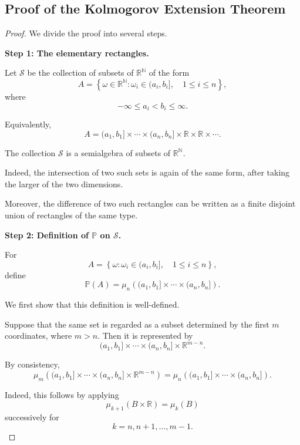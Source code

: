 
\subsection{Proof of the Kolmogorov Extension Theorem}

\begin{proof}

We divide the proof into several steps.

\medskip
\noindent
\textbf{Step 1: The elementary rectangles.}

Let $\mathcal{S}$ be the collection of subsets of
$\mathbb{R}^{\mathbb{N}}$ of the form
\[
A=
\left\{
\omega\in\mathbb{R}^{\mathbb{N}}:
\omega_i\in(a_i,b_i],
\quad
1\leq i\leq n
\right\},
\]
where
\[
-\infty\leq a_i<b_i\leq\infty.
\]

Equivalently,
\[
A=
(a_1,b_1]\times\cdots\times(a_n,b_n]
\times\mathbb{R}\times\mathbb{R}\times\cdots.
\]

The collection $\mathcal{S}$ is a semialgebra of subsets of
$\mathbb{R}^{\mathbb{N}}$.

Indeed, the intersection of two such sets is again of the same
form, after taking the larger of the two dimensions.

Moreover, the difference of two such rectangles can be written as a
finite disjoint union of rectangles of the same type.

\medskip
\noindent
\textbf{Step 2: Definition of $\mathbb{P}$ on $\mathcal{S}$.}

For
\[
A=
\left\{
\omega:
\omega_i\in(a_i,b_i],
\quad
1\leq i\leq n
\right\},
\]
define
\[
\boxed{
\mathbb{P}(A)
=
\mu_n
\left(
(a_1,b_1]\times\cdots\times(a_n,b_n]
\right).
}
\tag{1}
\]

We first show that this definition is well-defined.

Suppose that the same set is regarded as a subset determined by the
first $m$ coordinates, where $m>n$. Then it is represented by
\[
(a_1,b_1]\times\cdots\times(a_n,b_n]
\times\mathbb{R}^{m-n}.
\]

By consistency,
\[
\mu_m
\left(
(a_1,b_1]\times\cdots\times(a_n,b_n]
\times\mathbb{R}^{m-n}
\right)
=
\mu_n
\left(
(a_1,b_1]\times\cdots\times(a_n,b_n]
\right).
\]

Indeed, this follows by applying
\[
\mu_{k+1}(B\times\mathbb{R})
=
\mu_k(B)
\]
successively for
\[
k=n,n+1,\ldots,m-1.
\]


\end{proof}
